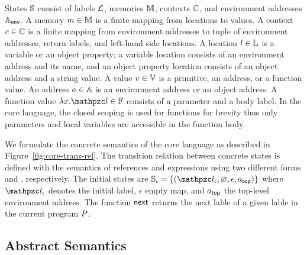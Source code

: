 States $\mathbb{S}$ consist of labels $\mathcal{L}$, memories $\mathbb{M}$, contexts
$\mathbb{C}$, and environment addresses $\mathbb{A}_{\textsf{env}}$.  A memory $m \in \mathbb{M}$
is a finite mapping from locations to values.  A context $c \in \mathbb{C}$ is
a finite mapping from environment addresses to tuple of environment addresses,
return labels, and left-hand side locations.  A location $l \in \mathbb{L}$ is a
variable or an object property; a variable location consists of an environment
address and its name, and an object property location consists of an object
address and a string value.  A value $v \in \mathbb{V}$ is a primitive, an
address, or a function value.  An address $a \in \mathbb{A}$ is an environment
address or an object address.  A function value $\fval{x}{\lab} \in \fvalset$
consists of a parameter and a body label.  In the core language, the closed
scoping is used for functions for brevity thus only parameters and local
variables are accessible in the function body.

We formulate the concrete semantics of the core language as described in
Figure~\ref{fig:core-trans-rel}.  The transition relation between concrete
states is defined with the semantics of references and expressions using two
different forms  and
\fbox{$\exprrule{\st}{\expr}{\val}$}, respectively.  The initial states are
$\istset = \{ (\ilab, \varnothing, \epsilon, \tladdr) \}$ where $\ilab$ denotes
the initial label, $\epsilon$ empty map, and $a_{\textsf{top}}$ the top-level
environment address.  The function $\textsf{next}$ returns the next lable of a
given lable in the current program $P$.


\subsection{Abstract Semantics}

